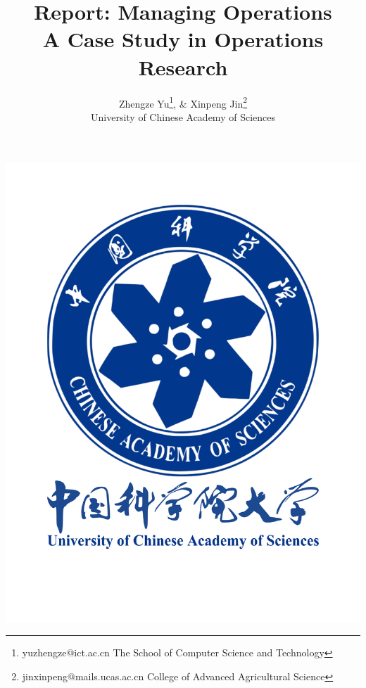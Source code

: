 \documentclass[12pt]{article}
\begin{document}
\title{Report:  Managing Operations \\ A Case Study in Operations Research}

\author
{Zhengze Yu\thanks{yuzhengze@ict.ac.cn \quad The School of Computer Science and Technology },
\& Xinpeng Jin\thanks{jinxinpeng@mails.ucas.ac.cn \quad
College of Advanced Agricultural Science}
\\University of Chinese Academy of Sciences}
    \maketitle
        \begin{center}
            \includegraphics[width=0.5\linewidth]{figure/logo.pdf}\\[4ex]
        \end{center}
    \setcounter{page}{1}
    \thispagestyle{empty}
    \newpage
	
\end{document}
